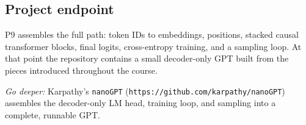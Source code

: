 \subsection*{Project endpoint}
P9 assembles the full path: token IDs to embeddings, positions, stacked causal
transformer blocks, final logits, cross-entropy training, and a sampling loop.
At that point the repository contains a small decoder-only GPT built from the
pieces introduced throughout the course.

\medskip
\noindent\textit{Go deeper:} Karpathy's \texttt{nanoGPT}
(\texttt{https://github.com/karpathy/nanoGPT}) assembles the decoder-only LM
head, training loop, and sampling into a complete, runnable GPT.
